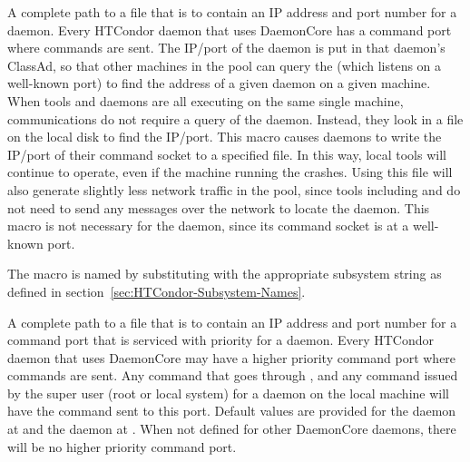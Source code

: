 \begin{description}
\label{param:SubsysAddressFile}
\item[\MacroB{<SUBSYS>\_ADDRESS\_FILE}]
  A complete path to a file that is to contain an
  IP address and port number for a daemon. 
  Every HTCondor daemon that uses
  DaemonCore has a command port where commands are sent.
  The IP/port of the daemon is put in that daemon's ClassAd,
  so that other machines in the pool can query the
   (which listens on a well-known port)
  to find the address of a given daemon on a given machine.
  When tools and daemons are all executing on the same
  single machine, communications do not require a query of the
   daemon.
  Instead, they look in a file on the local disk
  to find the IP/port.
  This macro causes daemons to write the
  IP/port of their command socket to a specified file.
  In this way,
  local tools will continue to operate,
  even if the machine running the  crashes.
  Using this file will also generate
  slightly less network traffic in the pool,
  since tools including  and
   do not need to send any messages over the network to
  locate the  daemon.
  This macro is not necessary for the  
  daemon, since its command socket is at a well-known port.  
  
  The macro is named by substituting 
  with the appropriate subsystem string as defined in
  section~\ref{sec:HTCondor-Subsystem-Names}.

\label{param:SubsysSuperAddressFile}
\item[\MacroB{<SUBSYS>\_SUPER\_ADDRESS\_FILE}]
  A complete path to a file that is to contain an IP address and port number 
  for a command port that is serviced with priority for a daemon. 
  Every HTCondor daemon that uses
  DaemonCore may have a higher priority command port where commands are sent.
  Any command that goes through , and any command issued by
  the super user (root or local system) for a daemon on the local machine
  will have the command sent to this port.
  Default values are provided for the  daemon at
  and the  daemon at
  .
  When not defined for other DaemonCore daemons,
  there will be no higher priority command port.
  

\end{description}
